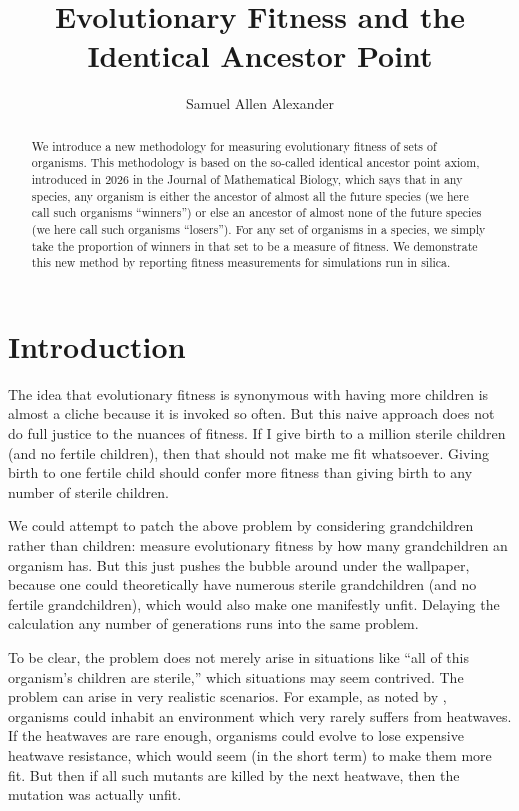 \documentclass{article}
\title{Evolutionary Fitness and the Identical Ancestor Point}
\author{Samuel Allen Alexander}
\begin{document}
\maketitle

\begin{abstract}
    We introduce a new methodology for measuring evolutionary fitness
    of sets of organisms.
    This methodology is based on the so-called identical ancestor point
    axiom, introduced in 2026 in the Journal of Mathematical Biology,
    which says that in any species, any organism is either the ancestor
    of almost all the future species (we here call such organisms ``winners'')
    or else an ancestor of almost none of the future species (we here
    call such organisms ``losers''). For any set of organisms in a species,
    we simply take the proportion of winners in that set to be a measure
    of fitness. We demonstrate this new method by reporting fitness measurements
    for simulations run in silica.
\end{abstract}

\section{Introduction}

The idea that evolutionary fitness is synonymous with having more children
is almost a cliche because it is invoked so often.
But this naive approach does not do full justice to the nuances of fitness.
If I give birth to a million sterile children (and no fertile children),
then that should not make me fit whatsoever. Giving birth to one fertile child
should confer more fitness than giving birth to any number of sterile children.

We could attempt to patch the above problem by considering grandchildren
rather than children: measure evolutionary fitness by how many grandchildren
an organism has. But this just pushes the bubble around under the wallpaper,
because one could theoretically have numerous sterile grandchildren (and no
fertile grandchildren), which would also make one manifestly unfit. Delaying
the calculation any number of generations runs into the same problem.

To be clear, the problem does not merely arise in situations like ``all of this
organism's children are sterile,'' which situations may seem contrived.
The problem can arise in very realistic scenarios. For example, as noted by
\cite{alexander2021can},
organisms could inhabit an environment which very rarely suffers from heatwaves.
If the heatwaves are rare enough, organisms could evolve to lose expensive heatwave
resistance, which would seem (in the short term) to make them more fit.
But then if all such mutants are killed by the next heatwave, then the
mutation was actually unfit.
\end{document}
